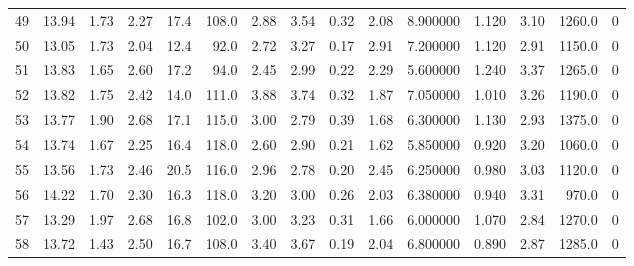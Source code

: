 \documentclass{article}
\begin{document}
\begin{tabular}{lrrrrrrrrrrrrrr}
    49  &    13.94 &        1.73 &  2.27 &               17.4 &      108.0 &           2.88 &        3.54 &                  0.32 &             2.08 &         8.900000 &  1.120 &                          3.10 &   1260.0 &      0 \\
    50  &    13.05 &        1.73 &  2.04 &               12.4 &       92.0 &           2.72 &        3.27 &                  0.17 &             2.91 &         7.200000 &  1.120 &                          2.91 &   1150.0 &      0 \\
    51  &    13.83 &        1.65 &  2.60 &               17.2 &       94.0 &           2.45 &        2.99 &                  0.22 &             2.29 &         5.600000 &  1.240 &                          3.37 &   1265.0 &      0 \\
    52  &    13.82 &        1.75 &  2.42 &               14.0 &      111.0 &           3.88 &        3.74 &                  0.32 &             1.87 &         7.050000 &  1.010 &                          3.26 &   1190.0 &      0 \\
    53  &    13.77 &        1.90 &  2.68 &               17.1 &      115.0 &           3.00 &        2.79 &                  0.39 &             1.68 &         6.300000 &  1.130 &                          2.93 &   1375.0 &      0 \\
    54  &    13.74 &        1.67 &  2.25 &               16.4 &      118.0 &           2.60 &        2.90 &                  0.21 &             1.62 &         5.850000 &  0.920 &                          3.20 &   1060.0 &      0 \\
    55  &    13.56 &        1.73 &  2.46 &               20.5 &      116.0 &           2.96 &        2.78 &                  0.20 &             2.45 &         6.250000 &  0.980 &                          3.03 &   1120.0 &      0 \\
    56  &    14.22 &        1.70 &  2.30 &               16.3 &      118.0 &           3.20 &        3.00 &                  0.26 &             2.03 &         6.380000 &  0.940 &                          3.31 &    970.0 &      0 \\
    57  &    13.29 &        1.97 &  2.68 &               16.8 &      102.0 &           3.00 &        3.23 &                  0.31 &             1.66 &         6.000000 &  1.070 &                          2.84 &   1270.0 &      0 \\
    58  &    13.72 &        1.43 &  2.50 &               16.7 &      108.0 &           3.40 &        3.67 &                  0.19 &             2.04 &         6.800000 &  0.890 &                          2.87 &   1285.0 &      0 \\

\end{tabular}
\end{document}
